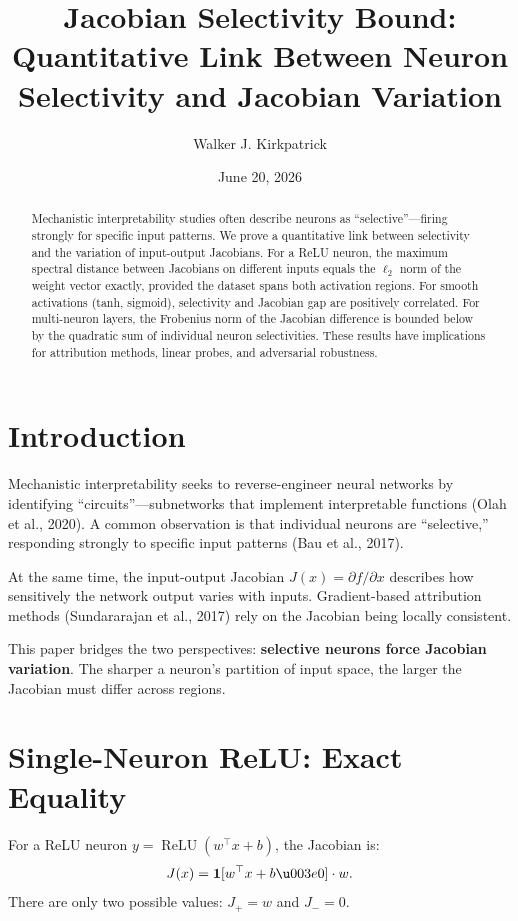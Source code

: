 \documentclass[11pt,a4paper]{amsart}
\title{Jacobian Selectivity Bound:\\Quantitative Link Between Neuron
Selectivity and Jacobian Variation}
\author{Walker J. Kirkpatrick}
\date{June 20, 2026}
\theoremstyle{plain}
\theoremstyle{definition}
\begin{document}
\maketitle

\begin{abstract}
Mechanistic interpretability studies often describe neurons as
``selective''---firing strongly for specific input patterns. We prove a
quantitative link between selectivity and the variation of
input-output Jacobians. For a ReLU neuron, the maximum spectral distance
between Jacobians on different inputs equals the $\ell_2$ norm of the
weight vector exactly, provided the dataset spans both activation
regions. For smooth activations (tanh, sigmoid), selectivity and
Jacobian gap are positively correlated. For multi-neuron layers, the
Frobenius norm of the Jacobian difference is bounded below by the
quadratic sum of individual neuron selectivities. These results have
implications for attribution methods, linear probes, and adversarial
robustness.
\end{abstract}

\section{Introduction}

Mechanistic interpretability seeks to reverse-engineer neural networks
by identifying ``circuits''---subnetworks that implement interpretable
functions (Olah et al., 2020). A common observation is that individual
neurons are ``selective,'' responding strongly to specific input
patterns (Bau et al., 2017).

At the same time, the input-output Jacobian $J(x)=\partial
f/\partial x$ describes how sensitively the network output varies with
inputs. Gradient-based attribution methods (Sundararajan et al., 2017)
rely on the Jacobian being locally consistent.

This paper bridges the two perspectives: \textbf{selective neurons
force Jacobian variation}. The sharper a neuron's partition of input
space, the larger the Jacobian must differ across regions.

\section{Single-Neuron ReLU: Exact Equality}

For a ReLU neuron $y=\operatorname{ReLU}(w^\top x+b)$, the Jacobian is:
\[
J(x) = \mathbf{1}[w^\top x+b\u003e0] \cdot w.
\]
There are only two possible values: $J_+=w$ and $J_-=0$.
\end{document}
